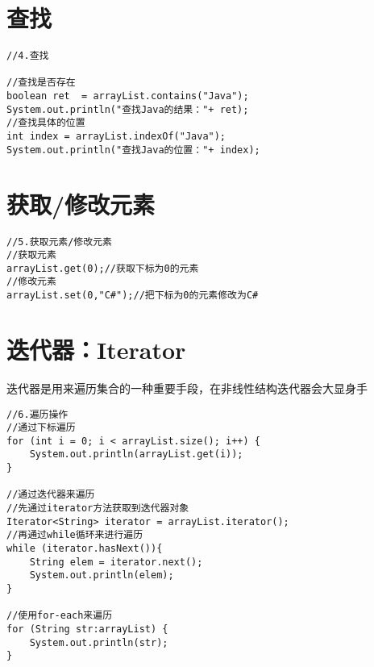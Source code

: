 \documentclass[a4paper]{report}
\begin{document}
\section{查找}
\begin{lstlisting}
//4.查找

//查找是否存在
boolean ret  = arrayList.contains("Java");
System.out.println("查找Java的结果："+ ret);
//查找具体的位置
int index = arrayList.indexOf("Java");
System.out.println("查找Java的位置："+ index);
\end{lstlisting}
\section{获取/修改元素}
\begin{lstlisting}
//5.获取元素/修改元素
//获取元素
arrayList.get(0);//获取下标为0的元素
//修改元素
arrayList.set(0,"C#");//把下标为0的元素修改为C#
\end{lstlisting}
\section{迭代器：Iterator}
迭代器是用来遍历集合的一种重要手段，在非线性结构迭代器会大显身手
\begin{lstlisting}
//6.遍历操作
//通过下标遍历
for (int i = 0; i < arrayList.size(); i++) {
    System.out.println(arrayList.get(i));
}

//通过迭代器来遍历
//先通过iterator方法获取到迭代器对象
Iterator<String> iterator = arrayList.iterator();
//再通过while循环来进行遍历
while (iterator.hasNext()){
    String elem = iterator.next();
    System.out.println(elem);
}

//使用for-each来遍历
for (String str:arrayList) {
    System.out.println(str);
}
\end{lstlisting}
\end{document}
